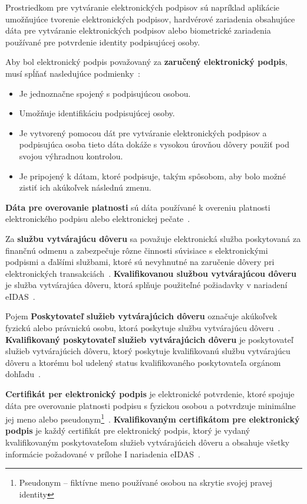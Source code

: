\documentclass[
  digital,     %
  oneside,     %
  nosansbold,  %
  nocolorbold, %
  lof,         %
  nolot,         %
]{fithesis4}
\begin{document}
\noindent
Prostriedkom pre vytváranie elektronických podpisov sú napríklad aplikácie umožňujúce tvorenie elektronických podpisov, hardvérové zariadenia obsahujúce dáta pre vytváranie elektronických podpisov alebo biometrické zariadenia používané pre potvrdenie identity podpisujúcej osoby. 

Aby bol elektronický podpis považovaný za \textbf{zaručený elektronický podpis}, musí spĺňať nasledujúce podmienky~\cite[čl.~3,~odst.~11]{eidas2024}:
\newpage
\begin{itemize}
    \item Je jednoznačne spojený s podpisujúcou osobou.
    \item Umožňuje identifikáciu podpisujúcej osoby.
    \item Je vytvorený pomocou dát pre vytváranie elektronických podpisov a podpisujúca osoba tieto dáta dokáže s vysokou úrovňou dôvery použiť pod svojou výhradnou kontrolou.
    \item Je pripojený k dátam, ktoré podpisuje, takým spôsobom, aby bolo možné zistiť ich akúkoľvek následnú zmenu.~\cite[čl.~26]{eidas2024}
\end{itemize}

\noindent
\textbf{Dáta pre overovanie platnosti} sú dáta používané k overeniu platnosti elektronického podpisu alebo elektronickej pečate~\cite[čl.~3,~odst.~40]{eidas2024}.

Za \textbf{službu vytvárajúcu dôveru} sa považuje elektronická služba poskytovaná za finančnú odmenu a zabezpečuje rôzne činnosti súvisiace s elektronickými podpismi a ďalšími službami, ktoré sú nevyhnutné na zaručenie dôvery pri elektronických transakciách~\cite[čl.~3,~odst.~16]{eidas2024}. \textbf{Kvalifikovanou službou vytvárajúcou dôveru} je služba vytvárajúca dôveru, ktorá splňuje použiteľné požiadavky v nariadení eIDAS~\cite[čl.~3,~odst.~17]{eidas2024}.

Pojem \textbf{Poskytovateľ služieb vytvárajúcich dôveru} označuje akúkoľvek fyzickú alebo právnickú osobu, ktorá poskytuje službu vytvárajúcu dôveru~\cite[čl.~3,~odst.~19]{eidas2024}. \textbf{Kvalifikovaný poskytovateľ služieb vytvárajúcich dôveru} je poskytovateľ služieb vytvárajúcich dôveru, ktorý poskytuje kvalifikovanú službu vytvárajúcu dôveru a ktorému bol udelený status kvalifikovaného poskytovateľa orgánom dohľadu~\cite[čl.~3,~odst.~20]{eidas2024}.

\textbf{Certifikát per elektronický podpis} je elektronické potvrdenie, ktoré spojuje dáta pre overovanie platnosti podpisu s fyzickou osobou a potvrdzuje minimálne jej meno alebo pseudonym\footnote{Pseudonym -- fiktívne meno používané osobou na skrytie svojej pravej identity}~\cite[čl.~3,~odst.~14]{eidas2024}. \textbf{Kvalifikovaným certifikátom pre elektronický podpis} je každý certifikát pre elektronický podpis, ktorý je vydaný kvalifikovaným poskytovateľom služieb vytvárajúcich dôveru a obsahuje všetky informácie požadované v prílohe I nariadenia eIDAS~\cites[čl.~3,~odst.~15]{eidas2024}[príloha I]{eidas2024}.
\end{document}
